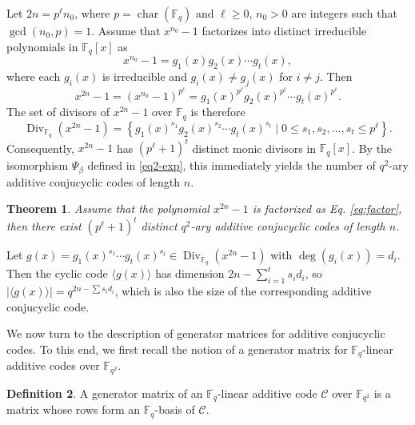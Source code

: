 \documentclass{aims}
\numberwithin{equation}{section}
\newtheorem{theorem}{Theorem}[section]
\theoremstyle{definition}
\newtheorem{definition}[theorem]{Definition}
\newcommand{\F}{\mathbb{F}}
\newcommand{\Div}{\operatorname{Div}}
\newcommand{\charac}{\operatorname{char}}
\begin{document}
Let $2n = p^{\ell}n_0$, where $p = \charac(\F_q)$ and $\ell \ge 0$, $n_0 > 0$ are integers such that $\gcd(n_0, p) = 1$. Assume that $x^{n_0} - 1$ factorizes into distinct irreducible polynomials in $\F_q[x]$ as
\[
x^{n_0} - 1 = g_1(x) g_2(x) \cdots g_t(x),
\]
where each $g_i(x)$ is irreducible and $g_i(x) \neq g_j(x)$ for $i \neq j$. Then
\begin{equation}\label{eq:factor}
	x^{2n} - 1 = (x^{n_0} - 1)^{p^{\ell}} = g_1(x)^{p^{\ell}} g_2(x)^{p^{\ell}} \cdots g_t(x)^{p^{\ell}}.
\end{equation}
The set of divisors of $x^{2n} - 1$ over $\F_q$ is therefore
\[
\Div_{\F_q}(x^{2n} - 1) = \left\{ g_1(x)^{s_1} g_2(x)^{s_2} \cdots g_t(x)^{s_t} \mid 0 \le s_1, s_2, \ldots, s_t \le p^{\ell} \right\}.
\]
Consequently, $x^{2n} - 1$ has $(p^{\ell} + 1)^t$ distinct monic divisors in $\F_q[x]$. By the isomorphism $\Psi_\beta$ defined in \eqref{eq2-exp}, this immediately yields the number of $q^2$-ary additive conjucyclic codes of length $n$.

\begin{theorem}\label{theo3.7}
	Assume that the polynomial $x^{2n}-1$ is factorized as Eq. \eqref{eq:factor}, then there exist $(p^{\ell}+1)^t$ distinct $q^2$-ary additive conjucyclic codes of length $n$.
\end{theorem}

Let $g(x) = g_1(x)^{s_1} \cdots g_t(x)^{s_t} \in \Div_{\F_q}(x^{2n}-1)$ with $\deg( g_i(x)) = d_i$. Then the cyclic code $\langle g(x) \rangle$ has dimension $2n - \sum_{i=1}^t s_i d_i$, so $|\langle g(x) \rangle| = q^{2n - \sum s_i d_i}$, which is also the size of the corresponding additive conjucyclic code.




We now turn to the description of generator matrices for additive conjucyclic codes. To this end, we first recall the notion of a generator matrix for $\F_q$-linear additive codes over $\F_{q^2}$.

\begin{definition}
	A generator matrix of an $\F_q$-linear additive code $\mathcal{C}$ over $\F_{q^2}$ is a matrix whose rows form an $\F_q$-basis of $\mathcal{C}$.
\end{definition}
\end{document}

